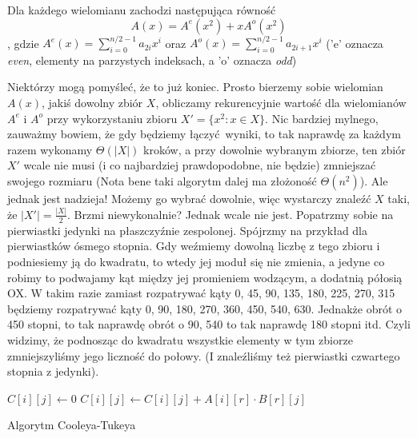 \begin{observation_small}
Dla każdego wielomianu zachodzi następująca równość $$A(x) = A^e(x^2) + xA^o(x^2)$$, gdzie $A^e(x) = \sum_{i=0}^{n/2 - 1}a_{2i}x^i$ oraz $A^o(x) = \sum_{i=0}^{n/2 - 1} a_{2i+1}x^i$
('e' oznacza \textit{even}, elementy na parzystych indeksach, a 'o' oznacza \textit{odd})
\end{observation_small}
Niektórzy mogą pomyśleć, że to już koniec. Prosto bierzemy sobie wielomian $A(x)$, jakiś dowolny zbiór $X$, obliczamy rekurencyjnie wartość dla wielomianów $A^e$ i $A^o$ przy wykorzystaniu zbioru $X' = \{x^2 : x \in X\}$.
Nic bardziej mylnego, zauważmy bowiem, że gdy będziemy łączyć wyniki, to tak naprawdę za każdym razem wykonamy $\Theta(|X|)$ kroków, a przy dowolnie wybranym zbiorze, ten zbiór $X'$ wcale nie musi (i co najbardziej prawdopodobne, nie będzie) zmniejszać swojego rozmiaru
(Nota bene taki algorytm dalej ma złożoność $\Theta(n^2)$).
Ale jednak jest nadzieja! Możemy go wybrać dowolnie, więc wystarczy znaleźć $X$ taki, że $|X'| = \frac{|X|}{2}$. Brzmi niewykonalnie? Jednak wcale nie jest. Popatrzmy sobie na pierwiastki jedynki na płaszczyźnie zespolonej. Spójrzmy na przykład dla pierwiastków ósmego stopnia.
Gdy weźmiemy dowolną liczbę z tego zbioru i podniesiemy ją do kwadratu, to wtedy jej moduł się nie zmienia, a jedyne co robimy to podwajamy kąt między jej promieniem wodzącym, a dodatnią półosią OX. W takim razie zamiast rozpatrywać kąty 0, 45, 90, 135, 180, 225, 270, 315 będziemy rozpatrywać kąty 0, 90, 180, 270, 360, 450, 540, 630. Jednakże obrót o 450 stopni, to tak naprawdę obrót o 90, 540 to tak naprawdę 180 stopni itd.
Czyli widzimy, że podnosząc do kwadratu wszystkie elementy w tym zbiorze zmniejszyliśmy jego liczność do połowy. (I znaleźliśmy też pierwiastki czwartego stopnia z jedynki).

\begin{algorithm}[H]
  \DontPrintSemicolon



  {
     {
	$C[i][j] \leftarrow 0$\;
	{
	  $C[i][j] \leftarrow C[i][j] + A[i][r] \cdot B[r][j]$\;
	}
     }
  }

  \caption{Algorytm Cooleya-Tukeya}
  \label{alg-fft-cooley-tukey}
\end{algorithm}

